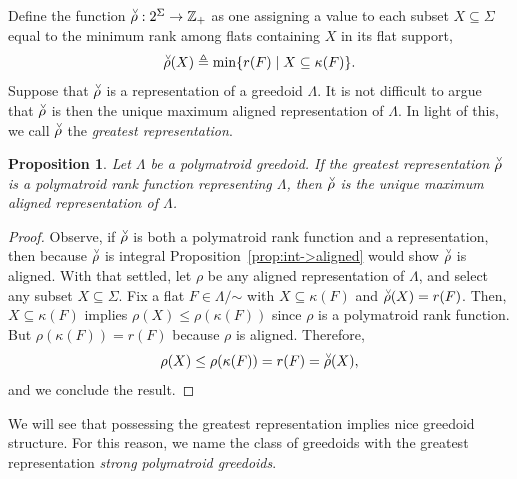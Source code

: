 \documentclass[11pt]{article}
\newtheorem{proposition}[theorem]{Proposition}
\newcommand{\univ}{\Sigma}
\newcommand{\glang}{\Lambda}
\begin{document}
Define the function $\accentset{\vee}{\rho}:2^\univ \to \mathbb{Z}_+$ as one assigning a value to each subset $X\subseteq\univ$ equal to the minimum rank among flats containing $X$ in its flat support,
\[
    \accentset{\vee}{\rho}(X) \triangleq \min\{r(F)\mid X\subseteq\kappa(F)\}.
\]
Suppose that $\accentset{\vee}{\rho}$ is a representation of a greedoid $\glang$.
It is not difficult to argue that $\accentset{\vee}{\rho}$ is then the unique maximum aligned representation of $\glang$.
In light of this, we call $\accentset{\vee}{\rho}$ the \emph{greatest representation}.
\begin{proposition}\label{prop:unique-max}
    Let $\glang$ be a polymatroid greedoid.
    If the greatest representation $\accentset{\vee}{\rho}$ is a polymatroid rank function representing $\glang$, then $\accentset{\vee}{\rho}$ is the unique maximum aligned representation of $\glang$.
\end{proposition}
\begin{proof}
    Observe, if $\accentset{\vee}{\rho}$ is both a polymatroid rank function and a representation, then because $\accentset{\vee}{\rho}$ is integral Proposition~\ref{prop:int->aligned} would show $\accentset{\vee}{\rho}$ is aligned.
    With that settled, let $\rho$ be any aligned representation of $\glang$, and select any subset $X\subseteq \univ$.
    Fix a flat $F\in\glang/\mathord{\sim}$ with $X \subseteq \kappa(F)$ and $\accentset{\vee}{\rho}(X) = r(F)$.
    Then, $X\subseteq\kappa(F)$ implies $\rho(X) \leq \rho(\kappa(F))$ since $\rho$ is a polymatroid rank function.
    But $\rho(\kappa(F)) = r(F)$ because $\rho$ is aligned.
    Therefore,
    \[
        \rho(X) \leq \rho(\kappa(F)) = r(F) = \accentset{\vee}{\rho}(X),
    \]
    and we conclude the result.
\end{proof}

We will see that possessing the greatest representation implies nice greedoid structure.
For this reason, we name the class of greedoids with the greatest representation \emph{strong polymatroid greedoids}.
\end{document}
